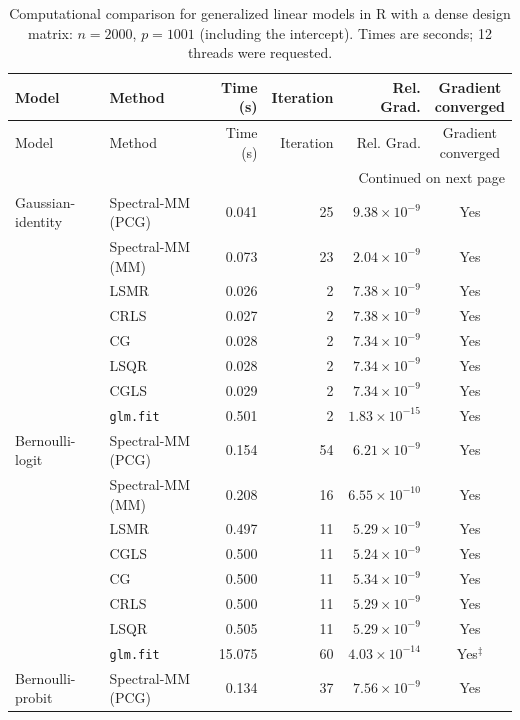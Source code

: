 \begingroup
\small
\setlength{\tabcolsep}{4pt}
\begin{longtable}{llrrrc}
\caption{Computational comparison for generalized linear models in R with a dense design matrix: $n=2000$, $p=1001$ (including the intercept). Times are seconds; 12 threads were requested.}
\label{tab:R-dense-glm-initial}\\
\toprule
Model & Method & Time (s) & Iteration & Rel. Grad. & \shortstack{Gradient\\converged} \\
\midrule
\endfirsthead
\toprule
Model & Method & Time (s) & Iteration & Rel. Grad. & \shortstack{Gradient\\converged} \\
\midrule
\endhead
\midrule
\multicolumn{6}{r}{Continued on next page}\\
\endfoot
\bottomrule
\endlastfoot
Gaussian-identity & Spectral-MM (PCG) & 0.041 & 25 & $9.38\times10^{-9}$ & Yes \\
 & Spectral-MM (MM) & 0.073 & 23 & $2.04\times10^{-9}$ & Yes \\
 & LSMR & 0.026 & 2 & $7.38\times10^{-9}$ & Yes \\
 & CRLS & 0.027 & 2 & $7.38\times10^{-9}$ & Yes \\
 & CG & 0.028 & 2 & $7.34\times10^{-9}$ & Yes \\
 & LSQR & 0.028 & 2 & $7.34\times10^{-9}$ & Yes \\
 & CGLS & 0.029 & 2 & $7.34\times10^{-9}$ & Yes \\
 & \texttt{glm.fit} & 0.501 & 2 & $1.83\times10^{-15}$ & Yes \\
\midrule
Bernoulli-logit & Spectral-MM (PCG) & 0.154 & 54 & $6.21\times10^{-9}$ & Yes \\
 & Spectral-MM (MM) & 0.208 & 16 & $6.55\times10^{-10}$ & Yes \\
 & LSMR & 0.497 & 11 & $5.29\times10^{-9}$ & Yes \\
 & CGLS & 0.500 & 11 & $5.24\times10^{-9}$ & Yes \\
 & CG & 0.500 & 11 & $5.34\times10^{-9}$ & Yes \\
 & CRLS & 0.500 & 11 & $5.29\times10^{-9}$ & Yes \\
 & LSQR & 0.505 & 11 & $5.29\times10^{-9}$ & Yes \\
 & \texttt{glm.fit} & 15.075 & 60 & $4.03\times10^{-14}$ & Yes$^{\ddagger}$ \\
\midrule
Bernoulli-probit & Spectral-MM (PCG) & 0.134 & 37 & $7.56\times10^{-9}$ & Yes \\

\end{longtable}
